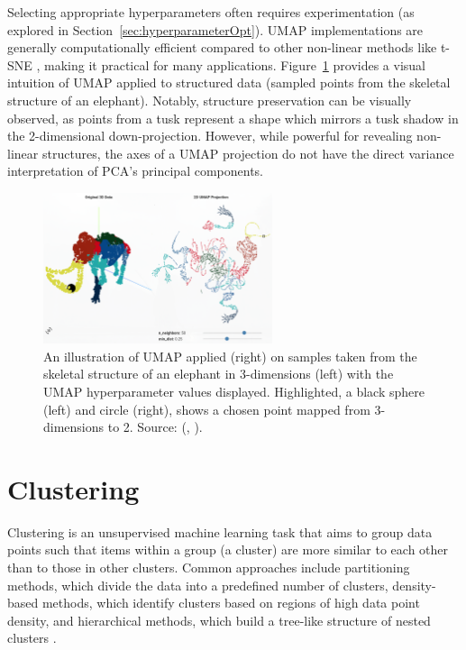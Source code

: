\documentclass[10pt,oneside]{report}
\renewcommand{\citet}[1]{\citeauthor{#1}, \citeyear{#1}}
\begin{document}
Selecting appropriate hyperparameters often requires experimentation (as explored in Section~\ref{sec:hyperparameterOpt}). UMAP implementations are generally computationally efficient compared to other non-linear methods like t-SNE \cite{cai2022theoretical, mcinnes2018umap}, making it practical for many applications. Figure~\ref{fig:umapElephant} provides a visual intuition of UMAP applied to structured data (sampled points from the skeletal structure of an elephant). Notably, structure preservation can be visually observed, as points from a tusk represent a shape which mirrors a tusk shadow in the 2-dimensional down-projection. However, while powerful for revealing non-linear structures, the axes of a UMAP projection do not have the direct variance interpretation of PCA's principal components.

\begin{figure}[htbp]
    \centering
    \includegraphics[width=0.6\textwidth]{./images/umapElephant.png}
    \caption{An illustration of UMAP applied (right) on samples taken from the skeletal structure of an elephant in 3-dimensions (left) with the UMAP hyperparameter values displayed. Highlighted, a black sphere (left) and circle (right), shows a chosen point mapped from 3-dimensions to 2. Source: (\citet{umapelephant}).}\label{fig:umapElephant}
\end{figure}


\section{Clustering}\label{sec:clustering}

Clustering is an unsupervised machine learning task that aims to group data points such that items within a group (a cluster) are more similar to each other than to those in other clusters. Common approaches include partitioning methods, which divide the data into a predefined number of clusters, density-based methods, which identify clusters based on regions of high data point density, and hierarchical methods, which build a tree-like structure of nested clusters \cite{kaufman2009finding}.
\end{document}
